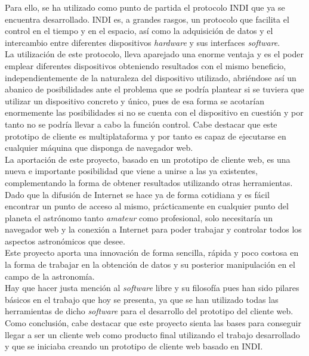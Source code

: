 Para ello, se ha utilizado como punto de partida el protocolo INDI que ya se encuentra desarrollado. INDI es, a grandes rasgos, un protocolo que facilita el control en el tiempo y en el espacio, así como la adquisición de datos y el intercambio entre diferentes dispositivos \textit{hardware} y sus interfaces \textit{software}.\\

La utilización de este protocolo, lleva aparejado una enorme ventaja y es el poder emplear diferentes dispositivos obteniendo resultados con el mismo beneficio, independientemente de la naturaleza del dispositivo utilizado, abriéndose así un abanico de posibilidades ante el problema que se podría plantear si se tuviera que utilizar un dispositivo concreto y único, pues de esa forma se acotarían enormemente las posibilidades si no se cuenta con el dispositivo en cuestión y por tanto no se podría llevar a cabo la función control. Cabe destacar que este prototipo de cliente es multiplataforma y por tanto es capaz de ejecutarse en cualquier máquina que disponga de navegador web.\\

La aportación de este proyecto, basado en un prototipo de cliente web, es una nueva e importante posibilidad  que viene a unirse a las ya existentes, complementando la forma de obtener resultados utilizando otras herramientas. \\

Dado que la difusión de Internet se hace ya de forma cotidiana y es fácil encontrar un punto de acceso al mismo, prácticamente en cualquier punto del planeta el astrónomo tanto \textit{amateur} como  profesional, solo necesitaría un navegador web y la conexión a Internet para poder trabajar y controlar todos los aspectos astronómicos que desee.\\

Este proyecto aporta una innovación de forma sencilla, rápida y poco costosa en la forma de trabajar en la obtención de datos y su posterior manipulación en el campo de la astronomía.\\

Hay que hacer justa mención al \textit{software} libre y su filosofía pues han sido pilares básicos en el trabajo que hoy se presenta, ya que se han utilizado todas las herramientas de dicho \textit{software} para el desarrollo del prototipo del cliente web.\\

Como conclusión, cabe destacar que este proyecto sienta las bases para conseguir llegar a ser un cliente web como producto final utilizando el trabajo desarrollado y que se iniciaba creando un prototipo de cliente web basado en INDI. \\


